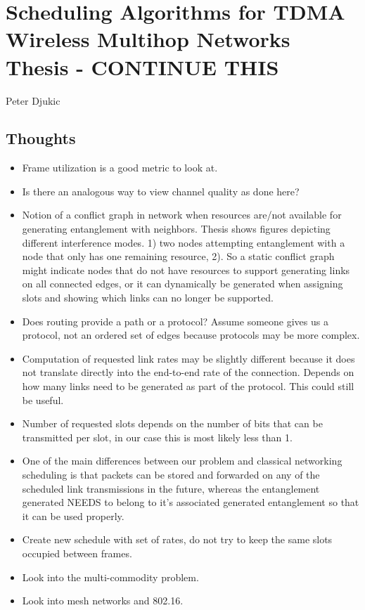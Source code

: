 \documentclass{article}
\begin{document}
\section{Scheduling Algorithms for TDMA Wireless Multihop Networks Thesis - CONTINUE THIS}
Peter Djukic

\subsection{Thoughts}
\begin{itemize}
    \item Frame utilization is a good metric to look at.
    \item Is there an analogous way to view channel quality as done here?
    \item Notion of a conflict graph in network when resources are/not available for generating entanglement with neighbors.  Thesis shows figures depicting different interference modes.  1) two nodes attempting entanglement with a node that only has one remaining resource, 2). So a static conflict graph might indicate nodes that do not have resources to support generating links on all connected edges, or it can dynamically be generated when assigning slots and showing which links can no longer be supported.
    \item Does routing provide a path or a protocol?  Assume someone gives us a protocol, not an ordered set of edges because protocols may be more complex.
    \item Computation of requested link rates may be slightly different because it does not translate directly into the end-to-end rate of the connection.  Depends on how many links need to be generated as part of the protocol.  This could still be useful.
    \item Number of requested slots depends on the number of bits that can be transmitted per slot, in our case this is most likely less than 1.
    \item One of the main differences between our problem and classical networking scheduling is that packets can be stored and forwarded on any of the scheduled link transmissions in the future, whereas the entanglement generated NEEDS to belong to it's associated generated entanglement so that it can be used properly.
    \item Create new schedule with set of rates, do not try to keep the same slots occupied between frames.
    \item Look into the multi-commodity problem.
    \item Look into mesh networks and 802.16.
\end{itemize}
\end{document}
